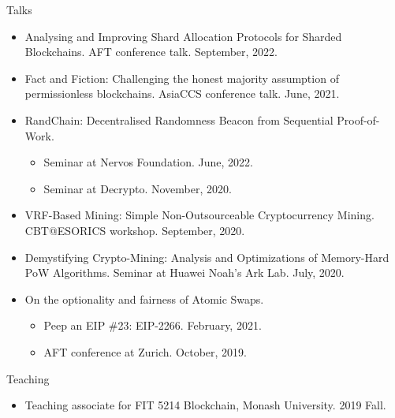 \documentclass{resume} %
\begin{document}
\begin{rSection}{Talks}
    \begin{itemize}
        \item Analysing and Improving Shard Allocation Protocols for Sharded Blockchains. AFT conference talk. September, 2022.
        \item Fact and Fiction: Challenging the honest majority assumption of permissionless blockchains. AsiaCCS conference talk. June, 2021.
        \item RandChain: Decentralised Randomness Beacon from Sequential Proof-of-Work.
              \begin{itemize}
                  \item Seminar at Nervos Foundation. June, 2022.
                  \item Seminar at Decrypto. November, 2020.
              \end{itemize}
        \item VRF-Based Mining: Simple Non-Outsourceable Cryptocurrency Mining. CBT@ESORICS workshop. September, 2020.
        \item Demystifying Crypto-Mining: Analysis and Optimizations of Memory-Hard PoW Algorithms. Seminar at Huawei Noah's Ark Lab. July, 2020.
        \item On the optionality and fairness of Atomic Swaps.
              \begin{itemize}
                  \item Peep an EIP \#23: EIP-2266. February, 2021.
                  \item AFT conference at Zurich. October, 2019.
              \end{itemize}
    \end{itemize}
\end{rSection}


\begin{rSection}{Teaching}
    \begin{itemize}
        \item Teaching associate for FIT 5214 Blockchain, Monash University. 2019 Fall.
    \end{itemize}
\end{rSection}
\end{document}
